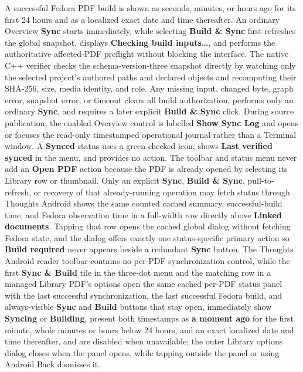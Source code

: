 {A successful Fedora PDF build is shown as seconds, minutes, or hours ago for its first 24 hours and as a localized exact date and time thereafter.
An ordinary Overview \textbf{Sync} starts immediately, while selecting \textbf{Build \& Sync} first refreshes the global snapshot, displays \textbf{Checking build inputs\ldots}, and performs the authoritative affected-PDF preflight without blocking the interface.
The native C++ verifier checks the schema-version-three snapshot directly by watching only the selected project's authored paths and declared objects and recomputing their SHA-256, size, media identity, and role.
Any missing input, changed byte, graph error, snapshot error, or timeout clears all build authorization, performs only an ordinary \textbf{Sync}, and requires a later explicit \textbf{Build \& Sync} click.
During source publication, the enabled Overview control is labelled \textbf{Show Sync Log} and opens or focuses the read-only timestamped operational journal rather than a Terminal window.
A \textbf{Synced} status uses a green checked icon, shows \textbf{Last verified synced} in the menu, and provides no action.
The toolbar and status menu never add an \textbf{Open PDF} action because the PDF is already opened by selecting its Library row or thumbnail.
Only an explicit \textbf{Sync}, \textbf{Build \& Sync}, pull-to-refresh, or recovery of that already-running operation may fetch status through .
Thoughts Android shows the same counted cached summary, successful-build time, and Fedora observation time in a full-width row directly above \textbf{Linked documents}.
Tapping that row opens the cached global dialog without fetching Fedora state, and the dialog offers exactly one status-specific primary action so \textbf{Build required} never appears beside a redundant \textbf{Sync} button.
The Thoughts Android reader toolbar contains no per-PDF synchronization control, while the first \textbf{Sync \& Build} tile in the three-dot menu and the matching row in a managed Library PDF's options open the same cached per-PDF status panel with the last successful synchronization, the last successful Fedora build, and always-visible \textbf{Sync} and \textbf{Build} buttons that stay open, immediately show \textbf{Syncing} or \textbf{Building}, present both timestamps as \textbf{a moment ago} for the first minute, whole minutes or hours below 24 hours, and an exact localized date and time thereafter, and are disabled when unavailable; the outer Library options dialog closes when the panel opens, while tapping outside the panel or using Android Back dismisses it.
}
